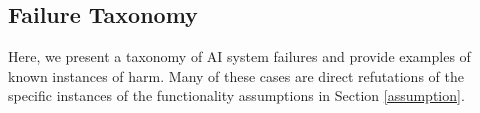 \documentclass[acmconf,manuscript,screen,natbib=true]{acmart}
\begin{document}
\subsection{Failure Taxonomy}


Here, we present a taxonomy of AI system failures and provide examples of known instances of harm. 
Many of these cases are direct refutations of the specific instances of the functionality assumptions in Section \ref{assumption}. 

\end{document}
